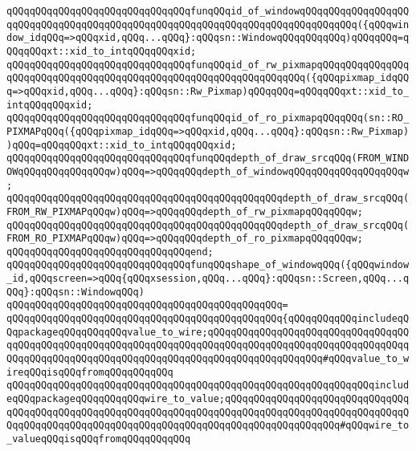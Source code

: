 \newline
\verb|qQQqqQQqqQQqqQQqqQQqqQQqqQQqqQQqfunqQQqid_of_windowqQQqqQQqqQQqqQQqqQQqqQQqqQQqqQQqqQQqqQQqqQQqqQQqqQQqqQQqqQQqqQQqqQQqqQQqqQQqqQQq({qQQqwindow_idqQQq=>qQQqxid,qQQq...qQQq}:qQQqsn::WindowqQQqqQQqqQQq)qQQqqQQq=qQQqqQQqxt::xid_to_intqQQqqQQqxid;|\newline
\verb|qQQqqQQqqQQqqQQqqQQqqQQqqQQqqQQqfunqQQqid_of_rw_pixmapqQQqqQQqqQQqqQQqqQQqqQQqqQQqqQQqqQQqqQQqqQQqqQQqqQQqqQQqqQQqqQQqqQQq({qQQqpixmap_idqQQq=>qQQqxid,qQQq...qQQq}:qQQqsn::Rw_Pixmap)qQQqqQQq=qQQqqQQqxt::xid_to_intqQQqqQQqxid;|\newline
\verb|qQQqqQQqqQQqqQQqqQQqqQQqqQQqqQQqfunqQQqid_of_ro_pixmapqQQqqQQq(sn::RO_PIXMAPqQQq({qQQqpixmap_idqQQq=>qQQqxid,qQQq...qQQq}:qQQqsn::Rw_Pixmap))qQQq=qQQqqQQqxt::xid_to_intqQQqqQQqxid;|\newline
\newline
\verb|qQQqqQQqqQQqqQQqqQQqqQQqqQQqqQQqfunqQQqdepth_of_draw_srcqQQq(FROM_WINDOWqQQqqQQqqQQqqQQqw)qQQq=>qQQqqQQqdepth_of_windowqQQqqQQqqQQqqQQqqQQqw;|\newline
\verb|qQQqqQQqqQQqqQQqqQQqqQQqqQQqqQQqqQQqqQQqqQQqqQQqdepth_of_draw_srcqQQq(FROM_RW_PIXMAPqQQqw)qQQq=>qQQqqQQqdepth_of_rw_pixmapqQQqqQQqw;|\newline
\verb|qQQqqQQqqQQqqQQqqQQqqQQqqQQqqQQqqQQqqQQqqQQqqQQqdepth_of_draw_srcqQQq(FROM_RO_PIXMAPqQQqw)qQQq=>qQQqqQQqdepth_of_ro_pixmapqQQqqQQqw;|\newline
\verb|qQQqqQQqqQQqqQQqqQQqqQQqqQQqqQQqend;|\newline
\newline
\verb|qQQqqQQqqQQqqQQqqQQqqQQqqQQqqQQqfunqQQqshape_of_windowqQQq({qQQqwindow_id,qQQqscreen=>qQQq{qQQqxsession,qQQq...qQQq}:qQQqsn::Screen,qQQq...qQQq}:qQQqsn::WindowqQQq)|\newline
\verb|qQQqqQQqqQQqqQQqqQQqqQQqqQQqqQQqqQQqqQQqqQQqqQQq=|\newline
\verb|qQQqqQQqqQQqqQQqqQQqqQQqqQQqqQQqqQQqqQQqqQQqqQQq{qQQqqQQqqQQqincludeqQQqpackageqQQqqQQqqQQqvalue_to_wire;qQQqqQQqqQQqqQQqqQQqqQQqqQQqqQQqqQQqqQQqqQQqqQQqqQQqqQQqqQQqqQQqqQQqqQQqqQQqqQQqqQQqqQQqqQQqqQQqqQQqqQQqqQQqqQQqqQQqqQQqqQQqqQQqqQQqqQQqqQQqqQQqqQQqqQQqqQQqqQQq#qQQqvalue_to_wireqQQqisqQQqfromqQQqqQQqqQQq|\newline
\verb|qQQqqQQqqQQqqQQqqQQqqQQqqQQqqQQqqQQqqQQqqQQqqQQqqQQqqQQqqQQqqQQqincludeqQQqpackageqQQqqQQqqQQqwire_to_value;qQQqqQQqqQQqqQQqqQQqqQQqqQQqqQQqqQQqqQQqqQQqqQQqqQQqqQQqqQQqqQQqqQQqqQQqqQQqqQQqqQQqqQQqqQQqqQQqqQQqqQQqqQQqqQQqqQQqqQQqqQQqqQQqqQQqqQQqqQQqqQQqqQQqqQQqqQQqqQQq#qQQqwire_to_valueqQQqisqQQqfromqQQqqQQqqQQq|\newline
